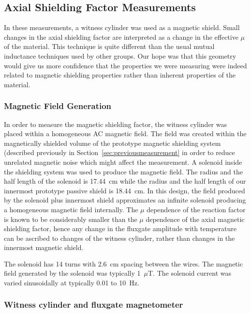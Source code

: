 
\subsection{Axial Shielding Factor Measurements}

In these measurements, a witness cylinder was used as a magnetic
shield.  Small changes in the axial shielding factor are interpreted
as a change in the effective $\mu$ of the material.  This technique is
quite different than the usual mutual inductance techniques used by
other groups.  Our hope was that this geometry would give us more
confidence that the properties we were measuring were indeed related
to magnetic shielding properties rather than inherent properties of
the material.

\subsubsection{Magnetic Field Generation}

In order to measure the magnetic shielding factor, the witness
cylinder was placed within a homogeneous AC magnetic field.  The field
was created within the magnetically shielded volume of the prototype
magnetic shielding system (described previously in
Section~\ref{sec:previousmeasurement} in order to reduce unrelated magnetic noise
which might affect the measurement.  A solenoid inside the shielding
system was used to produce the magnetic field.  The radius and the
half length of the solenoid is 17.44~cm while the radius and the half
length of our innermost prototype passive shield is 18.44~cm.  In this
design, the field produced by the solenoid plus innermost shield
approximates an infinite solenoid producing a homogeneous magnetic
field internally.  The $\mu$ dependence of the reaction factor is
known to be considerably smaller than the $\mu$ dependence of the
axial magnetic shielding factor, hence any change in the fluxgate
amplitude with temperature can be ascribed to changes of the witness
cylinder, rather than changes in the innermost magnetic shield.

The solenoid has 14 turns with 2.6~cm spacing between the wires.  The
magnetic field generated by the solenoid was typically 1~$\mu$T.  The
solenoid current was varied sinusoidally at typically 0.01 to 10~Hz.


\subsubsection{Witness cylinder and fluxgate magnetometer}


